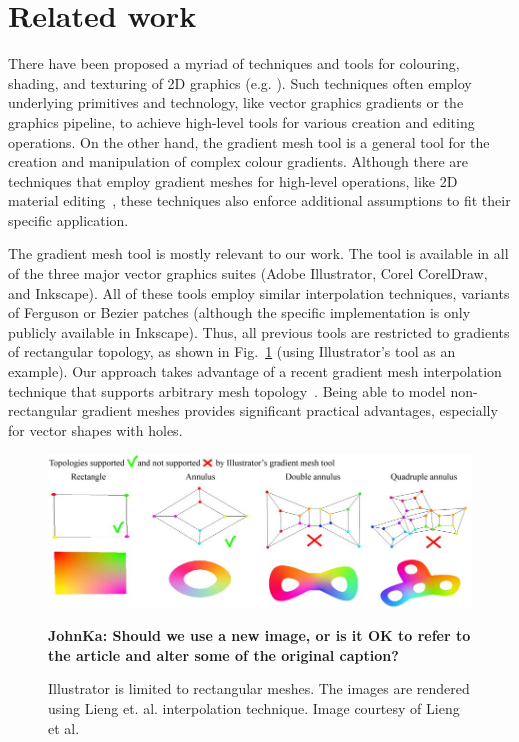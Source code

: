 \documentclass{egpubl}
\newcommand{\note}[3]{{\color{#2}\textbf{#1: #3}}}
\newcommand{\john}[1]{\note{JohnKa}{RubineRed}{#1}}
\begin{document}
	\section{Related work}
	\label{sec:RW}
	
	There have been proposed a myriad of techniques and tools for colouring, shading, and texturing of 2D graphics (e.g. \cite{Vergne:2012, Shao:2012, Orzan:2008}). Such techniques often employ underlying primitives and technology, like vector graphics gradients or the graphics pipeline, to achieve high-level tools for various creation and editing operations. On the other hand, the gradient mesh tool is a general tool for the creation and manipulation of complex colour gradients. Although there are techniques that employ gradient meshes for high-level operations, like 2D material editing~\cite{Lopez-Moreno:2013}, these techniques also enforce additional assumptions to fit their specific application.
	
	The gradient mesh tool is mostly relevant to our work. The tool is available in all of the three major vector graphics suites (Adobe Illustrator, Corel CorelDraw, and Inkscape). All of these tools employ similar interpolation techniques, variants of Ferguson or Bezier patches (although the specific implementation is only publicly available in Inkscape). Thus, all previous tools are restricted to gradients of rectangular topology, as shown in Fig.~\ref{fig:IllustratorVsOur} (using Illustrator's tool as an example). Our approach takes advantage of a recent gradient mesh interpolation technique that supports arbitrary mesh topology~\cite{Lieng:2016}. Being able to model non-rectangular gradient meshes provides significant practical advantages, especially for vector shapes with holes.
	
	\begin{figure}
		\includegraphics[]{illustratorVsOur.jpg}
		\caption{Illustrator is limited to rectangular meshes. The images are rendered using Lieng et. al. \cite{Lieng:2016} interpolation technique. Image courtesy of Lieng et al.}
		\john{Should we use a new image, or is it OK to refer to the article and alter some of the original caption?}
		\label{fig:IllustratorVsOur}
	\end{figure}
	
\end{document}
